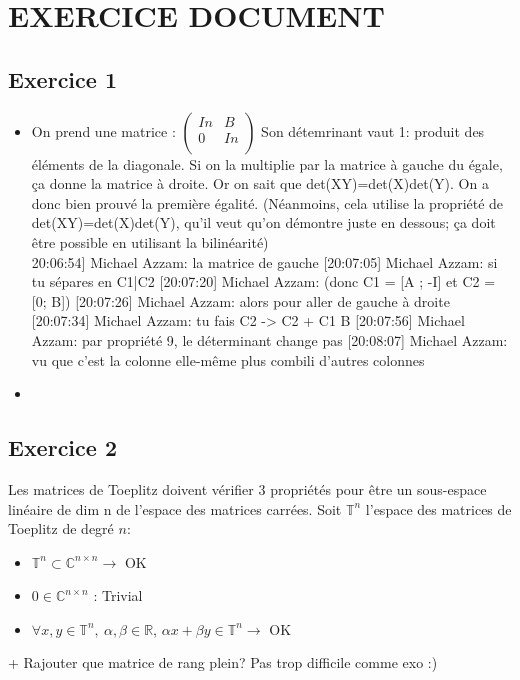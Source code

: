 \section{EXERCICE DOCUMENT}

\subsection*{Exercice 1}
\begin{itemize}
\item On prend une matrice :
$\begin{pmatrix}
In & B\\ 0&  In \\
\end{pmatrix}$
Son détemrinant vaut 1: produit des éléments de la diagonale.
Si on la multiplie par la matrice à gauche du égale, ça donne la matrice à droite.
Or on sait que det(XY)=det(X)det(Y).
On a donc bien prouvé la première égalité.
(Néanmoins, cela utilise la propriété de det(XY)=det(X)det(Y), qu'il veut qu'on démontre juste en dessous; ça doit être possible en utilisant la bilinéarité)
\\20:06:54] Michael Azzam: la matrice de gauche
 [20:07:05] Michael Azzam: si tu sépares en C1|C2
 [20:07:20] Michael Azzam: (donc C1 = [A ; -I] et C2 = [0; B])
 [20:07:26] Michael Azzam: alors pour aller de gauche à droite
 [20:07:34] Michael Azzam: tu fais C2 -> C2 + C1 B
 [20:07:56] Michael Azzam: par propriété 9, le déterminant change pas
 [20:08:07] Michael Azzam: vu que c'est la colonne elle-même plus combili d'autres colonnes
\item
\end{itemize}
\subsection*{Exercice 2}


Les matrices de Toeplitz doivent vérifier 3 propriétés pour être un sous-espace linéaire de dim n de l'espace des matrices carrées. Soit $\mathbb{T}^n$ l'espace des matrices de Toeplitz de degré $n$:

\renewcommand{\labelitemi}{$\surd$}
\begin{itemize}
\item $\mathbb{T}^n \subset \mathbb{C}^{n\times n} \rightarrow$ OK
\item $0 \in \mathbb{C}^{n\times n}$ : Trivial
\item $\forall x,y \in \mathbb{T}^n,\  \alpha,\beta \in \mathbb{R}$,   $\alpha x + \beta y \in \mathbb{T}^n \rightarrow$ OK\\
\end{itemize}
+ Rajouter que matrice de rang plein?
Pas trop difficile comme exo :)

